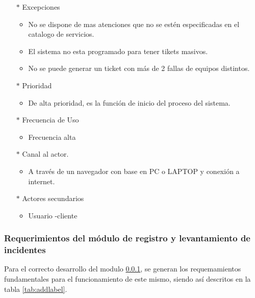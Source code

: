 \begin{multicols}{2}
\begin{itemize}
\begin{itemize}
		\item El Agentes de la mesa de servicio (Nivel 1) captura los datos del equipo de computo 
		\item El Agentes de la mesa de servicio (Nivel 1) asigna el nivel de SLA, y la asignación del personal de mesa de servicio para su seguimiento y atención. 
	\end{itemize}
	\item[$*$]  Excepciones
	\begin{itemize}
		\item No se dispone de mas atenciones que no se estén especificadas en el catalogo de servicios. 
		\item El sistema no esta programado para tener tikets masivos. 
		\item No se puede generar un ticket con más de 2 fallas de equipos distintos.	
	\end{itemize}
	\item[$*$]  Prioridad
	\begin{itemize}
		\item De alta prioridad, es la función de inicio del proceso del sistema.
	\end{itemize}
	\item[$*$]  Frecuencia de Uso
\begin{itemize}
	\item Frecuencia alta
\end{itemize}
	\item[$*$]   Canal al actor.
\begin{itemize}
	\item 	A través de un navegador con base en PC o LAPTOP y conexión a internet.
\end{itemize}
	\item[$*$]  Actores secundarios
\begin{itemize}
	\item Usuario -cliente
\end{itemize}
\end{itemize}

\end{multicols}



\subsubsection{Requerimientos del módulo de registro y levantamiento de incidentes}\label{Mod:RQLDI}%
Para el correcto desarrollo del modulo \ref{Mod:RQLDI}, se generan los requemamientos fundamentales para el funcionamiento de este mismo, siendo así descritos en la tabla \ref{tab:addlabel}.

